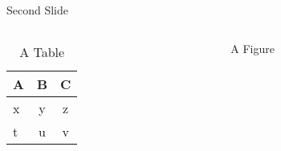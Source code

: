 \documentclass[dvipdfmx,unicode,10pt]{beamer}
\begin{document}
\begin{frame}{Second Slide}
  \begin{columns}
    \begin{column}{0.5\textwidth}
      \begin{table}
        \caption{A Table}
        \begin{tabular}{l|c c}
          \hline
          A & B & C \\
          \hline
          x & y & z \\
          t & u & v \\
          \hline
        \end{tabular}
      \end{table}
    \end{column}

    \begin{column}{0.5\textwidth}
      \begin{figure}
        \caption{A Figure}
      \end{figure}
    \end{column}
  \end{columns}
\end{frame}
\end{document}
